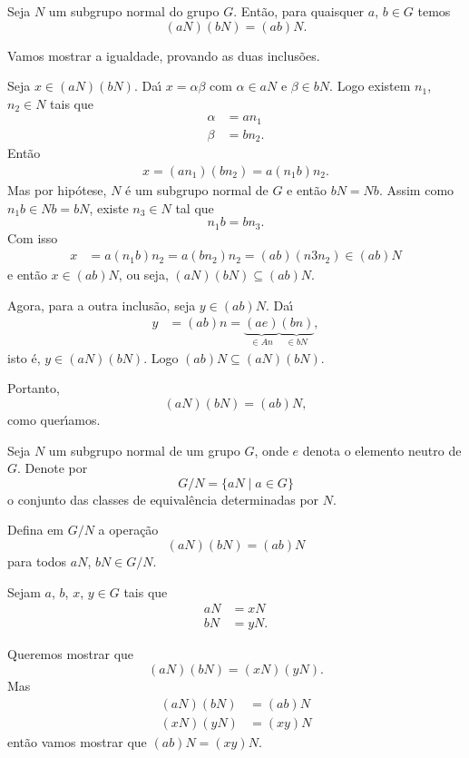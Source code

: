 \begin{proposicao}
    Seja $N$ um subgrupo normal do grupo $G$. Ent\~ao, para quaisquer $a$, $b \in G$ temos
    \[
        (aN)(bN) = (ab)N.
    \]
\end{proposicao}
\begin{prova}
	Vamos mostrar a igualdade, provando as duas inclus\~oes.

	Seja $x \in (aN)(bN)$. Da{\'\i} $x = \alpha\beta$ com $\alpha \in aN$ e $\beta \in bN$. Logo existem $n_1$, $n_2 \in N$ tais que
	\begin{align*}
		\alpha &= an_1\\
		\beta &= bn_2.
	\end{align*}
	Ent\~ao
	\begin{align*}
		x = (an_1)(bn_2) = a(n_1b)n_2.
	\end{align*}
	Mas por hip\'otese, $N$ \'e um subgrupo normal de $G$ e ent\~ao $bN = Nb$. Assim como $n_1b \in Nb = bN$, existe $n_3 \in N$ tal que
	\[
		n_1b = bn_3.
	\]
	Com isso
	\begin{align*}
		x &= a(n_1b)n_2 = a(bn_2)n_2 = (ab)(n3n_2) \in (ab)N
	\end{align*}
	e ent\~ao $x \in (ab)N$, ou seja, $(aN)(bN) \subseteq (ab)N$.

	Agora, para a outra inclus\~ao, seja $y \in (ab)N$. Da{\'\i}
	\begin{align*}
		y &= (ab)n = \underbrace{(ae)}_{\in An}\underbrace{(bn)}_{\in bN},
	\end{align*}
	isto \'e, $y \in (aN)(bN)$. Logo $(ab)N \subseteq (aN)(bN)$.

	Portanto,
	\[
		(aN)(bN) = (ab)N,
	\]
	como quer{\'\i}amos.
\end{prova}

Seja $N$ um subgrupo normal de um grupo $G$, onde $e$ denota o elemento neutro de $G$. Denote por
\[
    G/N = \{aN \mid a \in G\}
\]
o conjunto das classes de equival\^encia determinadas por $N$.

Defina em $G/N$ a opera\c{c}\~ao
\[
    (aN)(bN)  = (ab)N
\]
para todos $aN$, $bN \in G/N$.

Sejam $a$, $b$, $x$, $y \in G$ tais que
\begin{align*}
	aN &= xN\\
	bN &= yN.
\end{align*}

Queremos mostrar que
\[
	(aN)(bN) = (xN)(yN).
\]
Mas
\begin{align*}
	(aN)(bN) &= (ab)N\\
	(xN)(yN) &= (xy)N
\end{align*}
ent\~ao vamos mostrar que $(ab)N = (xy)N$.

